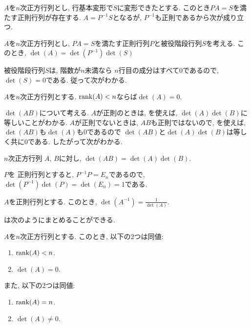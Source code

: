 $A$を$n$次正方行列とし,
行基本変形で$S$に変形できたとする.
このとき$PA=S$を満たす正則行列が存在する.
$A=P^{-1}S$となるが,
$P^{-1}$も正則であるから次が成り立つ.
\begin{lemma}
  $A$を$n$次正方行列とし,
  $PA=S$を満たす正則行列$P$と被役階段行列$S$を考える.
  このとき,
  $\det(A)=\det(P^{-1})\det(S)$
\end{lemma}
被役階段行列$S$は,
階数が$n$未満なら
$n$行目の成分はすべて$0$であるので,
$\det(S)=0$である.
従って次がわかる.
\begin{lemma}
  \label{lem:det:nonreg}
  $A$を$n$次正方行列とする.
  $\operatorname{rank}(A)<n$ならば$\det(A)=0$.
\end{lemma}
$\det(AB)$について考える.
$A$が正則のときは,
を使えば,
$\det(A)\det(B)$に等しいことがわかる.
$A$が正則でないときは, $AB$も正則ではないので,
を使えば,
$\det(AB)$も$\det(A)$も$0$であるので
$\det(AB)$と$\det(A)\det(B)$は等しく共に0である.
したがって次がわかる.
\begin{theorem}
  \label{thm:det:hom}
  $n$次正方行列
  $A$, $B$に対し,
  $\det(AB)=\det(A)\det(B)$.
\end{theorem}
$P$を
正則行列とすると,
$P^{-1}P=E_n$であるので,
$\det(P^{-1})\det(P)=\det(E_n)=1$である.
\begin{theorem}
  $A$を正則行列とする.
  このとき,
  $\det(A^{-1})=\frac{1}{\det(A)}$.
\end{theorem}
は次のようにまとめることができる.
\begin{theorem}
  $A$を$n$次正方行列とする.
  このとき, 以下の2つは同値:
  \begin{enumerate}
  \item $\operatorname{rank}(A)<n$.
  \item $\det(A)=0$.
  \end{enumerate}
  また, 以下の2つは同値:
  \begin{enumerate}
  \item $\operatorname{rank}(A)=n$.
  \item $\det(A)\neq 0$.
  \end{enumerate}
\end{theorem}


